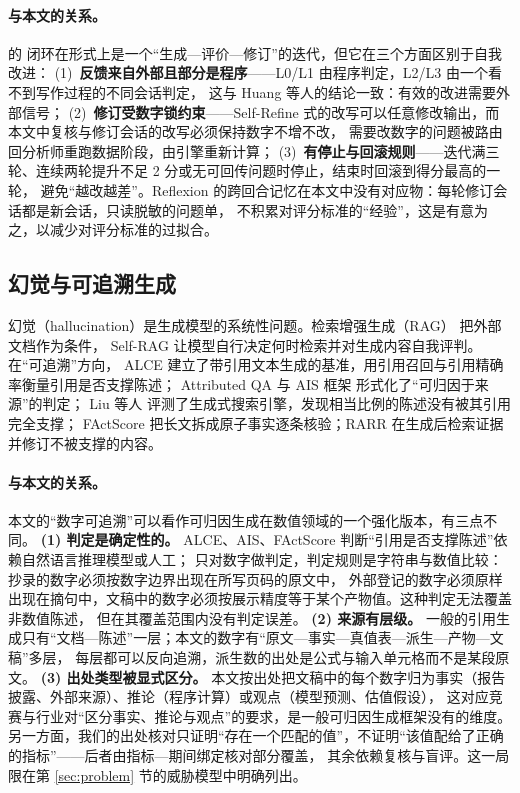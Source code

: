 \paragraph{与本文的关系。}
\sysname{} 的  闭环在形式上是一个“生成—评价—修订”的迭代，但它在三个方面区别于自我改进：
(1)~\textbf{反馈来自外部且部分是程序}——L0/L1 由程序判定，L2/L3 由一个看不到写作过程的不同会话判定，
这与 Huang 等人的结论一致：有效的改进需要外部信号；
(2)~\textbf{修订受数字锁约束}——Self-Refine 式的改写可以任意修改输出，而本文中复核与修订会话的改写必须保持数字不增不改，
需要改数字的问题被路由回分析师重跑数据阶段，由引擎重新计算；
(3)~\textbf{有停止与回滚规则}——迭代满三轮、连续两轮提升不足 2 分或无可回传问题时停止，结束时回滚到得分最高的一轮，
避免“越改越差”。Reflexion 的跨回合记忆在本文中没有对应物：每轮修订会话都是新会话，只读脱敏的问题单，
不积累对评分标准的“经验”，这是有意为之，以减少对评分标准的过拟合。

\subsection{幻觉与可追溯生成}
\label{sec:rel-attribution}

幻觉（hallucination）是生成模型的系统性问题\cite{ji2023survey}。检索增强生成（RAG）\cite{lewis2020rag} 把外部文档作为条件，
Self-RAG\cite{asai2024selfrag} 让模型自行决定何时检索并对生成内容自我评判。在“可追溯”方向，
ALCE\cite{gao2023alce} 建立了带引用文本生成的基准，用引用召回与引用精确率衡量引用是否支撑陈述；
Attributed QA\cite{bohnet2022attributed} 与 AIS 框架\cite{rashkin2023attribution} 形式化了“可归因于来源”的判定；
Liu 等人\cite{liu2023verifiability} 评测了生成式搜索引擎，发现相当比例的陈述没有被其引用完全支撑；
FActScore\cite{min2023factscore} 把长文拆成原子事实逐条核验；RARR\cite{gao2023rarr} 在生成后检索证据并修订不被支撑的内容。

\paragraph{与本文的关系。}
本文的“数字可追溯”可以看作可归因生成在数值领域的一个强化版本，有三点不同。
\textbf{(1) 判定是确定性的。} ALCE、AIS、FActScore 判断“引用是否支撑陈述”依赖自然语言推理模型或人工；
\sysname{} 只对数字做判定，判定规则是字符串与数值比较：抄录的数字必须按数字边界出现在所写页码的原文中，
外部登记的数字必须原样出现在摘句中，文稿中的数字必须按展示精度等于某个产物值。这种判定无法覆盖非数值陈述，
但在其覆盖范围内没有判定误差。
\textbf{(2) 来源有层级。} 一般的引用生成只有“文档—陈述”一层；本文的数字有“原文—事实—真值表—派生—产物—文稿”多层，
每层都可以反向追溯，派生数的出处是公式与输入单元格而不是某段原文。
\textbf{(3) 出处类型被显式区分。} 本文按出处把文稿中的每个数字归为事实（报告披露、外部来源）、推论（程序计算）或观点（模型预测、估值假设），
这对应竞赛与行业对“区分事实、推论与观点”的要求，是一般可归因生成框架没有的维度。
另一方面，我们的出处核对只证明“存在一个匹配的值”，不证明“该值配给了正确的指标”——后者由指标—期间绑定核对部分覆盖，
其余依赖复核与盲评。这一局限在第 \ref{sec:problem} 节的威胁模型中明确列出。

